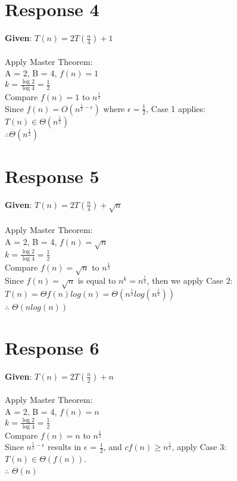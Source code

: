 \documentclass[12pt, a4paper]{article}
\begin{document}
\section*{\centering Response 4}
    \textbf{Given}: \(T(n) = 2T(\frac{n}{4}) + 1\)\\
    \\
    Apply Master Theorem:\\
    A = 2, B = 4, \(f(n) = 1\)\\
    \(k = \frac{\log{2}}{\log{4}} = \frac{1}{2}\)\\
    Compare \(f(n) = 1\) to \(n^{\frac{1}{2}}\)\\
    Since \(f(n) = O(n^{\frac{1}{2} - \epsilon})\) where \(\epsilon = \frac{1}{2}\), Case 1 applies:\\
    \(T(n) \in \Theta{(n^{\frac{1}{2}})}\)\\
    \(\therefore \Theta(n^{\frac{1}{2}})\)


\section*{\centering Response 5}
    \textbf{Given}: \(T(n) = 2T(\frac{n}{4}) + \sqrt{n}\)\\
    \\
    Apply Master Theorem:\\
    A = 2, B = 4, \(f(n) = \sqrt{n}\)\\
    \(k = \frac{\log{2}}{\log{4}} = \frac{1}{2}\)\\
    Compare \(f(n) = \sqrt{n}\) to \(n^{\frac{1}{2}}\)\\
    Since \(f(n) = \sqrt{n}\) is equal to \(n^k = n^{\frac{1}{2}}\), then we apply Case 2:\\
    \(T(n) = \Theta{f(n)log(n)} = \Theta{(n^{\frac{1}{2}}log(n^{\frac{1}{2}}))}\)\\
    $\therefore$ \(\Theta{(nlog(n))}\)

\section*{\centering Response 6}
    \textbf{Given}: \(T(n)=2T(\frac{n}{2}) + n\)\\
    \\
    Apply Master Theorem:\\
    A = 2, B = 4, \(f(n) = n\)\\
    \(k = \frac{\log{2}}{\log{4}} = \frac{1}{2}\)\\
    Compare \(f(n) = n\) to \(n^{\frac{1}{2}}\)\\
    Since \(n^{\frac{1}{2} - \epsilon}\) results in $\epsilon$ = $\frac{1}{2}$, and \(cf(n) \geq n^{\frac{1}{2}}\), apply Case 3:\\
    \(T(n) \in \Theta{(f(n))}\).\\
    $\therefore$ $\Theta{(n)}$\\
\end{document}
